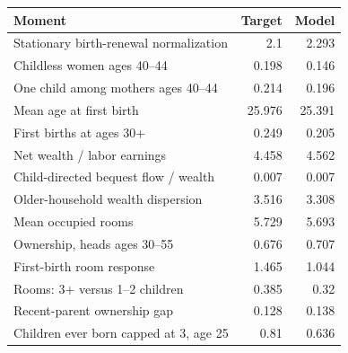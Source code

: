 \begingroup\footnotesize
\setlength{\tabcolsep}{3pt}
\renewcommand{\arraystretch}{1.04}
\begin{tabularx}{\linewidth}{Xrr}
\toprule
Moment & Target & Model \\
\midrule
Stationary birth-renewal normalization & 2.1 & 2.293 \\
Childless women ages 40–44 & 0.198 & 0.146 \\
One child among mothers ages 40–44 & 0.214 & 0.196 \\
Mean age at first birth & 25.976 & 25.391 \\
First births at ages 30+ & 0.249 & 0.205 \\
Net wealth / labor earnings & 4.458 & 4.562 \\
Child-directed bequest flow / wealth & 0.007 & 0.007 \\
Older-household wealth dispersion & 3.516 & 3.308 \\
Mean occupied rooms & 5.729 & 5.693 \\
Ownership, heads ages 30–55 & 0.676 & 0.707 \\
First-birth room response & 1.465 & 1.044 \\
Rooms: 3+ versus 1–2 children & 0.385 & 0.32 \\
Recent-parent ownership gap & 0.128 & 0.138 \\
Children ever born capped at 3, age 25 & 0.81 & 0.636 \\
\bottomrule
\end{tabularx}
\endgroup
